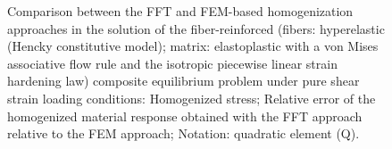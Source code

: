 \begin{figure}[hbt]
\begin{subfigure}[b]{0.49\textwidth}
      \caption{}
      \label{subfig:von_mises_res_mat_large_strain_2D_shear_material_response_error}
    \end{subfigure}
  \caption{Comparison between the FFT and FEM-based homogenization approaches in the solution of the fiber-reinforced (fibers: hyperelastic (Hencky constitutive model); matrix: elastoplastic with a von Mises associative flow rule and the isotropic piecewise linear strain hardening law) composite equilibrium problem under pure shear strain loading conditions:  Homogenized stress;  Relative error of the homogenized material response obtained with the FFT approach relative to the FEM approach; Notation: quadratic element (Q).}
\label{fig:von_mises_res_mat_large_strain_2D_shear_material_response_and_error}
\end{figure}

